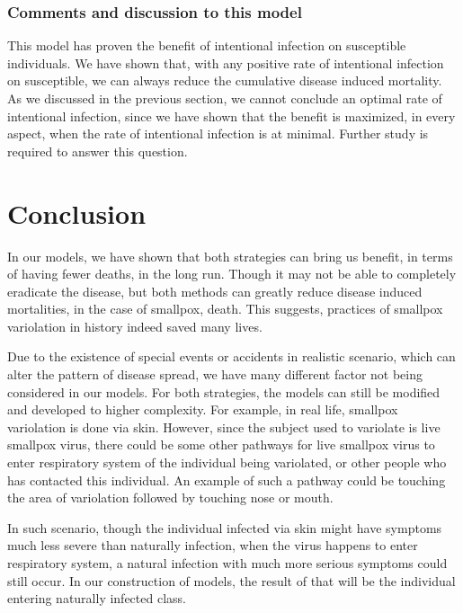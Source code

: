 \documentclass[12pt]{article}
\begin{document}
\subsubsection{Comments and discussion to this model}
This model has proven the benefit of intentional infection on susceptible individuals. We have shown that, with any positive rate of intentional infection on susceptible, we can always reduce the cumulative disease induced mortality. As we discussed in the previous section, we cannot conclude an optimal rate of intentional infection, since we have shown that the benefit is maximized, in every aspect, when the rate of intentional infection is at minimal. Further study is required to answer this question.
\section{Conclusion}
In our models, we have shown that both strategies can bring us benefit, in terms of having fewer deaths, in the long run. Though it may not be able to completely eradicate the disease, but both methods can greatly reduce disease induced mortalities, in the case of smallpox, death. This suggests, practices of smallpox variolation in history indeed saved many lives.

Due to the existence of special events or accidents in realistic scenario, which can alter the pattern of disease spread, we have many different factor not being considered in our models. For both strategies, the models can still be modified and developed to higher complexity. For example, in real life, smallpox variolation is done via skin. However, since the subject used to variolate is live smallpox virus, there could be some other pathways for live smallpox virus to enter respiratory system of the individual being variolated, or other people who has contacted this individual. An example of such a pathway could be touching the area of variolation followed by touching nose or mouth. 

In such scenario, though the individual infected via skin might have symptoms much less severe than naturally infection, when the virus happens to enter respiratory system, a natural infection with much more serious symptoms could still occur. In our construction of models, the result of that will be the individual entering naturally infected class.
\end{document}
